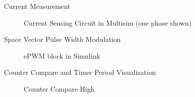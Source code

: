 \begin{frame}{Current Measurement}
	\begin{figure}
		\centering


		\caption{Current Sensing Circuit in Multisim (one phase shown)}
	\end{figure}
\end{frame}



\begin{frame}{Space Vector Pulse Width Modulation}
	\begin{figure}
		\centering


		\caption{ePWM block in Simulink}
	\end{figure}
\end{frame}



\begin{frame}{Counter Compare and Timer Period Visualization}
	\begin{figure}
		\centering
		\caption{Counter Compare High}
	\end{figure}
\end{frame}

